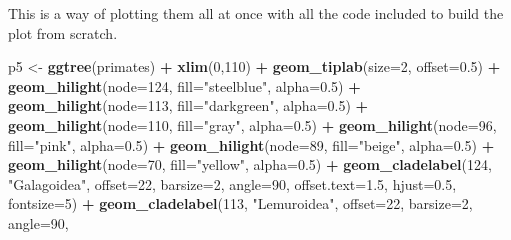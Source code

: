 \documentclass[]{book}
\newenvironment{Shaded}{\begin{snugshade}}{\end{snugshade}}
\newcommand{\KeywordTok}[1]{\textcolor[rgb]{0.13,0.29,0.53}{\textbf{#1}}}
\newcommand{\DataTypeTok}[1]{\textcolor[rgb]{0.13,0.29,0.53}{#1}}
\newcommand{\DecValTok}[1]{\textcolor[rgb]{0.00,0.00,0.81}{#1}}
\newcommand{\FloatTok}[1]{\textcolor[rgb]{0.00,0.00,0.81}{#1}}
\newcommand{\StringTok}[1]{\textcolor[rgb]{0.31,0.60,0.02}{#1}}
\newcommand{\OperatorTok}[1]{\textcolor[rgb]{0.81,0.36,0.00}{\textbf{#1}}}
\newcommand{\NormalTok}[1]{#1}
\begin{document}
This is a way of plotting them all at once with all the code included to
build the plot from scratch.

\begin{Shaded}
\begin{Highlighting}[]
\NormalTok{p5 <-}\StringTok{ }\KeywordTok{ggtree}\NormalTok{(primates) }\OperatorTok{+}
\StringTok{  }\KeywordTok{xlim}\NormalTok{(}\DecValTok{0}\NormalTok{,}\DecValTok{110}\NormalTok{) }\OperatorTok{+}
\StringTok{  }\KeywordTok{geom_tiplab}\NormalTok{(}\DataTypeTok{size=}\DecValTok{2}\NormalTok{, }\DataTypeTok{offset=}\FloatTok{0.5}\NormalTok{) }\OperatorTok{+}
\StringTok{  }\KeywordTok{geom_hilight}\NormalTok{(}\DataTypeTok{node=}\DecValTok{124}\NormalTok{, }\DataTypeTok{fill=}\StringTok{"steelblue"}\NormalTok{, }\DataTypeTok{alpha=}\FloatTok{0.5}\NormalTok{) }\OperatorTok{+}
\StringTok{  }\KeywordTok{geom_hilight}\NormalTok{(}\DataTypeTok{node=}\DecValTok{113}\NormalTok{, }\DataTypeTok{fill=}\StringTok{"darkgreen"}\NormalTok{, }\DataTypeTok{alpha=}\FloatTok{0.5}\NormalTok{) }\OperatorTok{+}
\StringTok{  }\KeywordTok{geom_hilight}\NormalTok{(}\DataTypeTok{node=}\DecValTok{110}\NormalTok{, }\DataTypeTok{fill=}\StringTok{"gray"}\NormalTok{, }\DataTypeTok{alpha=}\FloatTok{0.5}\NormalTok{) }\OperatorTok{+}
\StringTok{  }\KeywordTok{geom_hilight}\NormalTok{(}\DataTypeTok{node=}\DecValTok{96}\NormalTok{, }\DataTypeTok{fill=}\StringTok{"pink"}\NormalTok{, }\DataTypeTok{alpha=}\FloatTok{0.5}\NormalTok{) }\OperatorTok{+}
\StringTok{  }\KeywordTok{geom_hilight}\NormalTok{(}\DataTypeTok{node=}\DecValTok{89}\NormalTok{, }\DataTypeTok{fill=}\StringTok{"beige"}\NormalTok{, }\DataTypeTok{alpha=}\FloatTok{0.5}\NormalTok{) }\OperatorTok{+}
\StringTok{  }\KeywordTok{geom_hilight}\NormalTok{(}\DataTypeTok{node=}\DecValTok{70}\NormalTok{, }\DataTypeTok{fill=}\StringTok{"yellow"}\NormalTok{, }\DataTypeTok{alpha=}\FloatTok{0.5}\NormalTok{) }\OperatorTok{+}
\StringTok{  }\KeywordTok{geom_cladelabel}\NormalTok{(}\DecValTok{124}\NormalTok{, }\StringTok{"Galagoidea"}\NormalTok{, }\DataTypeTok{offset=}\DecValTok{22}\NormalTok{, }\DataTypeTok{barsize=}\DecValTok{2}\NormalTok{, }\DataTypeTok{angle=}\DecValTok{90}\NormalTok{,}
                  \DataTypeTok{offset.text=}\FloatTok{1.5}\NormalTok{, }\DataTypeTok{hjust=}\FloatTok{0.5}\NormalTok{, }\DataTypeTok{fontsize=}\DecValTok{5}\NormalTok{) }\OperatorTok{+}\StringTok{ }
\StringTok{  }\KeywordTok{geom_cladelabel}\NormalTok{(}\DecValTok{113}\NormalTok{, }\StringTok{"Lemuroidea"}\NormalTok{, }\DataTypeTok{offset=}\DecValTok{22}\NormalTok{, }\DataTypeTok{barsize=}\DecValTok{2}\NormalTok{, }\DataTypeTok{angle=}\DecValTok{90}\NormalTok{,}

\end{Highlighting}
\end{Shaded}
\end{document}
